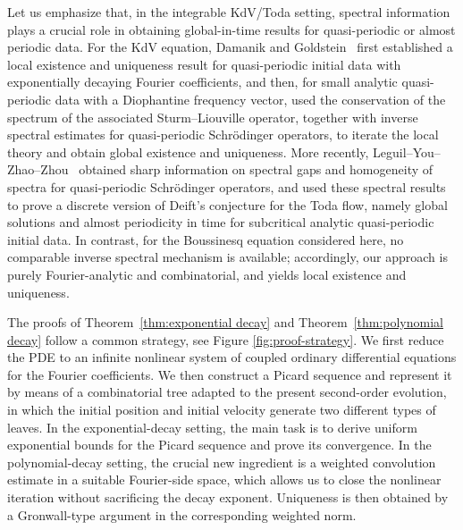 \documentclass[12pt,reqno,tbtags]{amsart}
\newcommand\1{\mathbbm{1}}
\begin{document}
Let us emphasize that, in the integrable KdV/Toda setting, spectral information
plays a crucial role in obtaining global-in-time results for quasi-periodic or almost
periodic data. For the KdV equation, Damanik and Goldstein~\cite{DG16} first
established a local existence and uniqueness result for quasi-periodic initial data
with exponentially decaying Fourier coefficients, and then, for small analytic
quasi-periodic data with a Diophantine frequency vector, used the conservation of
the spectrum of the associated Sturm--Liouville operator, together with inverse
spectral estimates for quasi-periodic Schr\"odinger operators, to iterate the local
theory and obtain global existence and uniqueness. More recently,
Leguil--You--Zhao--Zhou~\cite{LYZZ24} obtained sharp information on spectral gaps
and homogeneity of spectra for quasi-periodic Schr\"odinger operators, and used
these spectral results to prove a discrete version of Deift's conjecture for the
Toda flow, namely global solutions and almost periodicity in time for
subcritical analytic quasi-periodic initial data. In contrast, for the Boussinesq
equation considered here, no comparable inverse spectral mechanism is available;
accordingly, our approach is purely Fourier-analytic and combinatorial, and yields
local existence and uniqueness.

The proofs of Theorem~\ref{thm:exponential decay} and Theorem~\ref{thm:polynomial decay} follow a common
strategy, see Figure \ref{fig:proof-strategy}. We first reduce the PDE to an infinite nonlinear system of coupled ordinary
differential equations for the Fourier coefficients. We then construct a Picard
sequence and represent it by means of a combinatorial tree adapted to the present
second-order evolution, in which the initial position and initial velocity generate
two different types of leaves. In the exponential-decay setting, the main task is to
derive uniform exponential bounds for the Picard sequence and prove its convergence.
In the polynomial-decay setting, the crucial new ingredient is a weighted convolution
estimate in a suitable Fourier-side space, which allows us to close the nonlinear
iteration without sacrificing the decay exponent. Uniqueness is then obtained by a
Gronwall-type argument in the corresponding weighted norm. 
\end{document}
